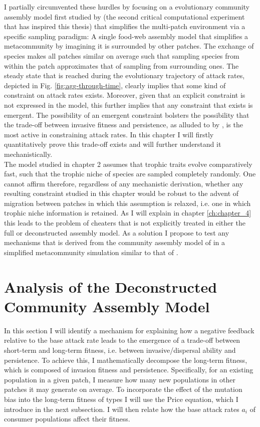 \documentclass[a4paper]{report}
\begin{document}
I partially circumvented these hurdles by focusing on a evolutionary community assembly model first studied by \citep{Rossberg2013} (the second critical computational experiment that has inspired this thesis) that simplifies the multi-patch environment via a specific sampling paradigm: A single food-web assembly model that simplifies a metacommunity by imagining it is surrounded by other patches. The exchange of species makes all patches similar on average such that sampling species from within the patch approximates that of sampling from surrounding ones. The steady state that is reached during the evolutionary trajectory of attack rates, depicted in Fig. \ref{fig:agg-through-time}, clearly implies that some kind of constraint on attack rates exists. Moreover, given that an explicit constraint is not expressed in the model, this further implies that any constraint that exists is emergent. The possibility of an emergent constraint bolsters the possibility that the trade-off between invasive fitness and persistence, as alluded to by \citep{Goodnight2008}, is the most active in constraining attack rates. In this chapter I will firstly quantitatively prove this trade-off exists and will further understand it mechanistically. \\

The model studied in chapter 2 assumes that trophic traits evolve comparatively fast, such that the trophic niche of species are sampled completely randomly. One cannot affirm therefore, regardless of any mechanistic derivation, whether any resulting constraint studied in this chapter  would be robust to the advent of migration between patches in which this assumption is relaxed, i.e. one in which trophic niche information is retained. As I will explain in chapter \ref{ch:chapter_4} this leads to the problem of cheaters that is not explicitly treated in either the full or deconstructed assembly model. As a solution I propose to test any mechanisms that is derived from the community assembly model of \citep{Rossberg2008} in a simplified metacommunity simulation similar to that of \citep{Goodnight2008}.

 \section{Analysis of the Deconstructed Community Assembly Model}

In this section I will identify a mechanism for explaining how a negative feedback relative to the base attack rate leads to the emergence of a trade-off between short-term and long-term fitness, i.e. between invasive/dispersal ability and persistence. To achieve this, I mathematically decompose the long-term fitness, which is composed of invasion fitness and persistence. Specifically, for an existing population in a given patch, I measure how many new populations in other patches it may generate on average. To incorporate the effect of the mutation bias into the long-term fitness of types I will use the Price equation, which I introduce in the next subsection. I will then relate how the base attack rates $a_i$ of consumer populations affect their fitness.
\end{document}
